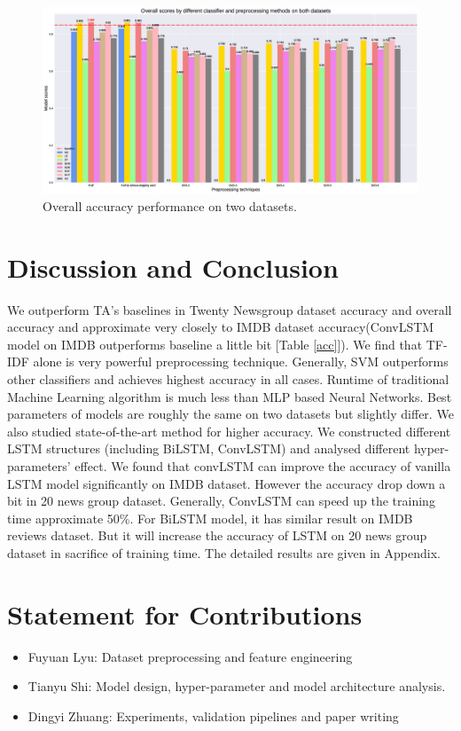 \documentclass[11pt]{scrartcl}
\begin{document}
\begin{figure}[H]
	\centering
	\includegraphics[width=0.9 \linewidth]{fig/model_acc_overall.eps}
	\caption{Overall accuracy performance on two datasets.}
	\label{overall_accuracy}
\end{figure}



\section{Discussion and Conclusion}
We outperform TA's baselines in Twenty Newsgroup dataset accuracy and overall accuracy and approximate very closely to IMDB dataset accuracy(ConvLSTM model on IMDB outperforms baseline a little bit [Table \ref{acc}]). We find that TF-IDF alone is very powerful preprocessing technique. Generally, SVM outperforms other classifiers and achieves highest accuracy in all cases. Runtime of traditional Machine Learning algorithm is much less than MLP based Neural Networks. Best parameters of models are roughly the same on two datasets but slightly differ. We also studied state-of-the-art method for higher accuracy. We constructed different LSTM structures (including BiLSTM\cite{graves2013hybrid}, ConvLSTM\cite{LSTM+CNN}) and analysed different hyper-parameters' effect. We found that convLSTM can improve the accuracy of vanilla LSTM model significantly on IMDB  dataset. However the accuracy drop down a bit in 20 news group dataset. Generally, ConvLSTM can speed up the training time approximate 50\%. For BiLSTM model, it has similar result on IMDB reviews dataset. But it will increase the accuracy of LSTM on 20 news group dataset in sacrifice of training time. The detailed results are given in Appendix.

\section{Statement for Contributions}
\begin{itemize}
	\item Fuyuan Lyu: Dataset preprocessing and feature engineering
	\item Tianyu Shi: Model design, hyper-parameter and model architecture analysis.
	\item Dingyi Zhuang: Experiments, validation pipelines and paper writing
\end{itemize}
\newpage

\end{document}
